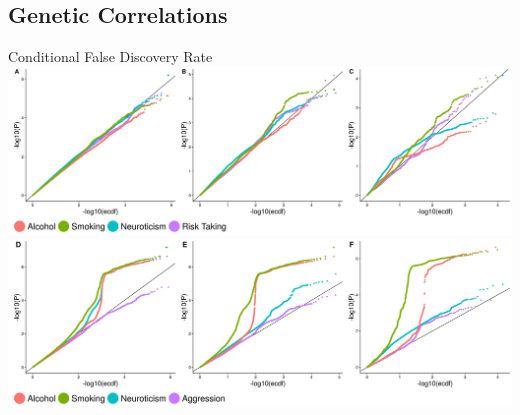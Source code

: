 \documentclass{beamer}
\begin{document}
\subsection{Genetic Correlations}

\begin{frame}[t]{Conditional False Discovery Rate}
  \includegraphics[width=1\linewidth]{../ukb_assoc/figure/cFDR/agg_cond.jpeg} \\
  \includegraphics[width=1\linewidth]{../ukb_assoc/figure/cFDR/risk_cond.jpeg}
\end{frame}
\end{document}
